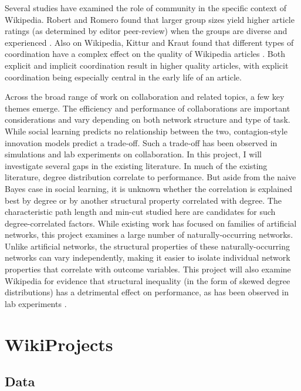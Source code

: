 Several studies have examined the role of community in the specific context
of Wikipedia.
Robert and Romero found that
larger group sizes yield higher article ratings
(as determined by editor peer-review)
when the groups are diverse and experienced
\cite{robert_when_2015}.
Also on Wikipedia,
Kittur and Kraut found that different types of coordination have a complex
effect on the quality of Wikipedia articles \cite{kittur_harnessing_2008}.
Both explicit and implicit coordination result in higher quality articles,
with explicit coordination being especially central in the early life of an
article.

Across the broad range of work on collaboration and related topics,
a few key themes emerge.
The efficiency and performance of collaborations are important considerations
and vary depending on both network structure and type of task.
While social learning predicts no relationship between the two,
contagion-style innovation models predict a trade-off.
Such a trade-off has been observed in simulations and lab experiments on
collaboration.
In this project, I will investigate several gaps in the existing literature.
In much of the existing literature,
degree distribution correlate to performance.
But aside from the naive Bayes case in social learning, it is unknown whether
the correlation is explained best by degree or by another structural property
correlated with degree.
The characteristic path length and min-cut studied here are candidates for such
degree-correlated factors.
While existing work has focused on families of artificial networks,
this project examines a large number of naturally-occurring networks.
Unlike artificial networks, the structural properties of these naturally-occurring
networks can vary independently, making it easier to isolate individual
network properties that correlate with outcome variables.
This project will also examine Wikipedia for evidence that structural
inequality (in the form of skewed
degree distributions) has a detrimental effect on performance,
as has been observed in lab experiments
\mbox{\cite{kearns_experiments_2012}}.

\section{WikiProjects}
\label{sec:wp}

\subsection{Data}

